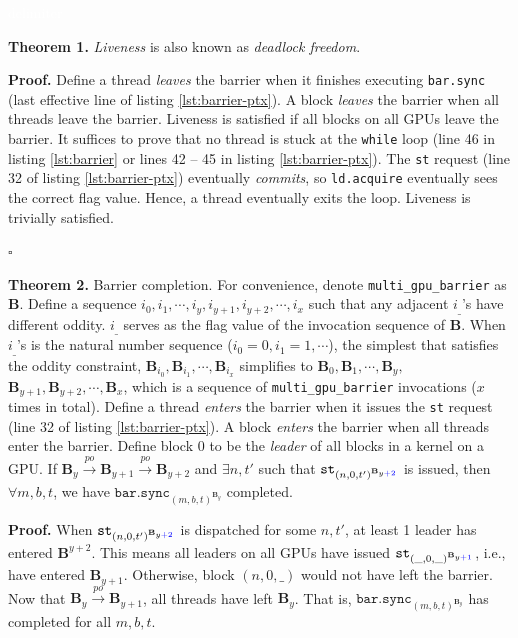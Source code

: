\documentclass[acmsmall]{acmart}
\begin{document}
\textcolor{white}{delimiter}

\noindent\textbf{Theorem 1.} \textit{Liveness} is also known as \textit{deadlock freedom}.

\noindent\textbf{Proof.} Define a thread \textit{leaves} the barrier when it finishes executing \verb|bar.sync| (last effective line of listing \ref{lst:barrier-ptx}). A block \textit{leaves} the barrier when all threads leave the barrier. Liveness is satisfied if all blocks on all GPUs leave the barrier. It suffices to prove that no thread is stuck at the \verb|while| loop (line 46 in listing \ref{lst:barrier} or lines 42 -- 45 in listing \ref{lst:barrier-ptx}). The \verb|st| request (line 32 of listing \ref{lst:barrier-ptx}) eventually \textit{commits}, so \verb|ld.acquire| eventually sees the correct flag value. Hence, a thread eventually exits the loop. Liveness is trivially satisfied.

\begin{flushright}
$\square$
\end{flushright}

\noindent\textbf{Theorem 2.} Barrier completion. For convenience, denote \verb|multi_gpu_barrier| as $\mathbf{B}$. Define a sequence $i_0, i_1, \cdots, i_y, i_{y+1}, i_{y+2}, \cdots, i_x$ such that any adjacent $i_\_$'s have different oddity. $i_\_$ serves as the flag value of the invocation sequence of $\mathbf{B}$. When $i_\_$'s is the natural number sequence ($i_0 = 0, i_1 = 1, \cdots$), the simplest that satisfies the oddity constraint, $\mathbf{B}_{i_0}, \mathbf{B}_{i_1}, \cdots, \mathbf{B}_{i_x}$ simplifies to $\mathbf{B}_0, \mathbf{B}_1, \cdots, \mathbf{B}_y,$ $\mathbf{B}_{y+1}, \mathbf{B}_{y+2}, \cdots, \mathbf{B}_x$, which is a sequence of \verb|multi_gpu_barrier| invocations ($x$ times in total). Define a thread \textit{enters} the barrier when it issues the \verb|st| request (line 32 of listing \ref{lst:barrier-ptx}). A block \textit{enters} the barrier when all threads enter the barrier. Define block 0 to be the \textit{leader} of all blocks in a kernel on a GPU.
If $\mathbf{B}_y \xrightarrow[]{po} \mathbf{B}_{y+1} \xrightarrow[]{po} \mathbf{B}_{y+2}$ and $\exists n,t'$ such that $\texttt{st}_{{(n,0,t')}^{\mathbf{B}_{y\textcolor{blue}{+2}}}}$ is issued, then $\forall m,b,t$, we have $\texttt{bar.sync}_{{(m,b,t)}^{\mathbf{B}_{y}}}$ completed.

\noindent\textbf{Proof.} When $\texttt{st}_{{(n,0,t')}^{\mathbf{B}_{y\textcolor{blue}{+2}}}}$ is dispatched for some $n,t'$, at least 1 leader has entered $\mathbf{B}^{y+2}$. This means all leaders on all GPUs have issued $\texttt{st}_{{(\_,0,\_)}^{\mathbf{B}_{y\textcolor{blue}{+1}}}}$, i.e., have entered $\mathbf{B}_{y+1}$. Otherwise, block $(n,0,\_)$ would not have left the barrier. Now that $\mathbf{B}_y \xrightarrow[]{po} \mathbf{B}_{y+1}$, all threads have left $\mathbf{B}_y$. That is, $\texttt{bar.sync}_{{(m,b,t)}^{\mathbf{B}_{y}}}$ has completed for all $m,b,t$.
\end{document}
